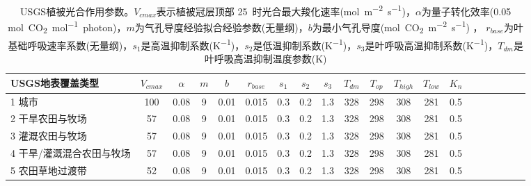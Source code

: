 \begin{landscape}
\begin{table}[htbp]
    \centering
    \caption[USGS植被光合作用参数]{USGS植被光合作用参数。$V_{cmax}$表示植被冠层顶部 25~\textcelsius 时光合最大羧化速率(\unit{mol.m^{-2}.s^{-1}})，$\alpha$为量子转化效率(0.05 \unit{mol.CO_2.mol^{-1}.photon})，$m$为气孔导度经验拟合经验参数(无量纲)，$b$为最小气孔导度(\unit{mol.CO_2.m^{-2}.s^{-1}}) ，
    $r_{base}$为叶基础呼吸速率系数(无量纲)，$s_1$是高温抑制系数(\unit{K^{-1}})，$s_2$是低温抑制系数(\unit{K^{-1}})，$s_3$是叶呼吸高温抑制系数(\unit{K^{-1}})，$T_{dm}$是叶呼吸高温抑制温度参数(K)}
    \label{tab:USGS植被光合作用参数1}
    \begin{tabular}{@{}lccccccccccccccccccc@{}}
    \toprule
    USGS地表覆盖类型     &$ V_{cmax}$ & $\alpha$ & $m$& $b$ & $r_{base}$ & $s_1$ & $s_2$ & $s_3$ & $T_{dm}$ & $T_{op}$ & $T_{high}$ & $T_{low}$ & $K_n$  \\ \midrule
    1 城市     & 100  & 0.08  & 9  & 0.01  & 0.015  & 0.3 & 0.2 & 1.3  & 328  & 298  & 308  & 281  & 0.5 \\
    2 干旱农田与牧场      & 57  & 0.08  & 9  & 0.01   & 0.015 & 0.3  & 0.2  & 1.3  & 328   & 298  & 308  & 281  & 0.5  \\
    3 灌溉农田与牧场      & 57  & 0.08  & 9  & 0.01   & 0.015 & 0.3  & 0.2 & 1.3   & 328   & 298  & 308 & 281   & 0.5  \\
    4 干旱/灌溉混合农田与牧场 & 57  & 0.08  & 9  & 0.01  & 0.015  & 0.3  & 0.2  & 1.3  & 328  & 298 & 308 & 281   & 0.5  \\
    5 农田草地过渡带      & 52                                                                & 0.08                                                                                                   & 9                                                                                  & 0.01                                                                               & 0.015                                                               & 0.3                                                       & 0.2                                                       & 1.3                                                       & 328                                                             & 298                                                             & 308                                                              & 281                                                               & 0.5                                                          \\

\end{tabular}
\end{table}
\end{landscape}
